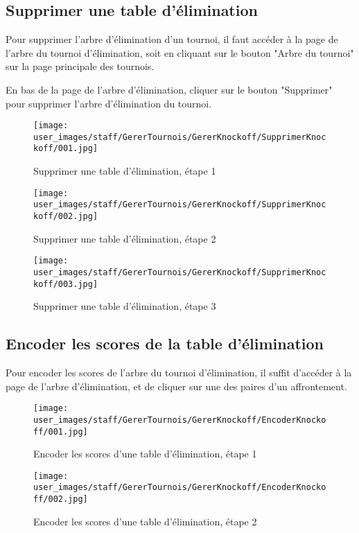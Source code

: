 \subsection{Supprimer une table d'élimination}

Pour supprimer l'arbre d'élimination d'un tournoi, il faut accéder à la page de l'arbre du tournoi d'élimination, soit en cliquant sur le bouton "Arbre du tournoi" sur la page principale des tournois.\newline

En bas de la page de l'arbre d'élimination, cliquer sur le bouton "Supprimer" pour supprimer l'arbre d'élimination du tournoi.

\begin{figure}[H]
\centering
\texttt{[image: user\_images/staff/GererTournois/GererKnockoff/SupprimerKnockoff/001.jpg]}
\caption{Supprimer une table d'élimination, étape 1}
\end{figure}

\begin{figure}[H]
\centering
\texttt{[image: user\_images/staff/GererTournois/GererKnockoff/SupprimerKnockoff/002.jpg]}
\caption{Supprimer une table d'élimination, étape 2}
\end{figure}

\begin{figure}[H]
\centering
\texttt{[image: user\_images/staff/GererTournois/GererKnockoff/SupprimerKnockoff/003.jpg]}
\caption{Supprimer une table d'élimination, étape 3}
\end{figure}

\subsection{Encoder les scores de la table d'élimination}

Pour encoder les scores de l'arbre du tournoi d'élimination, il suffit d'accéder à la page de l'arbre d'élimination, et de cliquer sur une des paires d'un affrontement.

\begin{figure}[H]
\centering
\texttt{[image: user\_images/staff/GererTournois/GererKnockoff/EncoderKnockoff/001.jpg]}
\caption{Encoder les scores d'une table d'élimination, étape 1}
\end{figure}

\begin{figure}[H]
\centering
\texttt{[image: user\_images/staff/GererTournois/GererKnockoff/EncoderKnockoff/002.jpg]}
\caption{Encoder les scores d'une table d'élimination, étape 2}
\end{figure}

